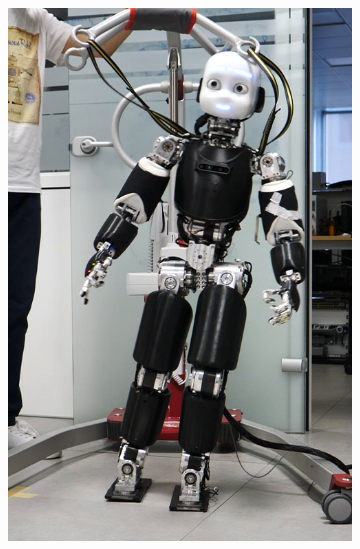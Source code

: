 \begin{figure}[!t]
\begin{subfigure}[b]{0.32\textwidth}
        \includegraphics[width=\columnwidth]{chapter_centroidal_mpc/figures/icub4.png}
    \end{subfigure}
    \hfill
    \begin{subfigure}[b]{0.32\textwidth}
        \centering

\end{subfigure}
\end{figure}
